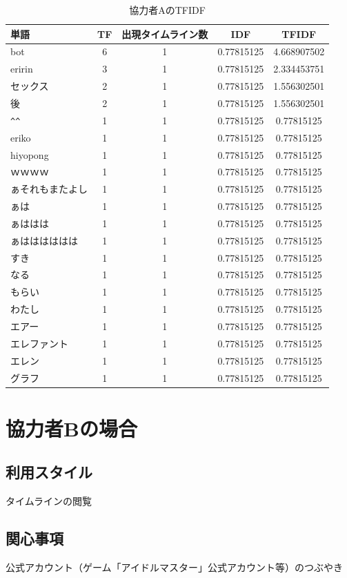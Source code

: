 \begin{table}[H]
	\centering
	\caption{協力者AのTFIDF}
	\begin{tabular}{l|c|c|c|c}
		単語 & TF & 出現タイムライン数 & IDF & TFIDF \\ \hline
		bot & 6 & 1 & 0.77815125 & 4.668907502 \\
		eririn & 3 & 1 & 0.77815125 & 2.334453751 \\
		セックス & 2 & 1 & 0.77815125 & 1.556302501 \\
		後 & 2 & 1 & 0.77815125 & 1.556302501 \\
		\verb|^|\verb|^| & 1 & 1 & 0.77815125 & 0.77815125 \\
		eriko & 1 & 1 & 0.77815125 & 0.77815125 \\
		hiyopong & 1 & 1 & 0.77815125 & 0.77815125 \\
		ｗｗｗｗ & 1 & 1 & 0.77815125 & 0.77815125 \\
		ぁそれもまたよし & 1 & 1 & 0.77815125 & 0.77815125 \\
		ぁは & 1 & 1 & 0.77815125 & 0.77815125 \\
		ぁははは & 1 & 1 & 0.77815125 & 0.77815125 \\
		ぁはははははは & 1 & 1 & 0.77815125 & 0.77815125 \\
		すき & 1 & 1 & 0.77815125 & 0.77815125 \\
		なる & 1 & 1 & 0.77815125 & 0.77815125 \\
		もらい & 1 & 1 & 0.77815125 & 0.77815125 \\
		わたし & 1 & 1 & 0.77815125 & 0.77815125 \\
		エアー & 1 & 1 & 0.77815125 & 0.77815125 \\
		エレファント & 1 & 1 & 0.77815125 & 0.77815125 \\
		エレン & 1 & 1 & 0.77815125 & 0.77815125 \\
		グラフ & 1 & 1 & 0.77815125 & 0.77815125
	\end{tabular}
\end{table}

\section{協力者Bの場合}

\subsection{利用スタイル}
タイムラインの閲覧

\subsection{関心事項}
公式アカウント（ゲーム「アイドルマスター」公式アカウント等）のつぶやき

